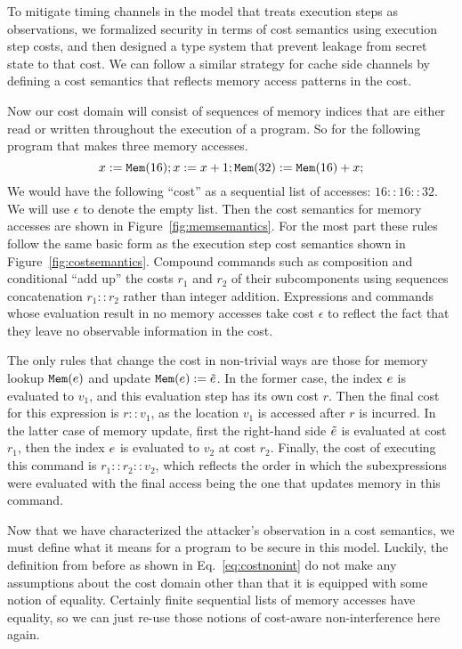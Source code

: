 \documentclass[11pt,twoside]{scrartcl}
\begin{document}
To mitigate timing channels in the model that treats execution steps as observations, we formalized security in terms of cost semantics using execution step costs, and then designed a type system that prevent leakage from secret state to that cost. We can follow a similar strategy for cache side channels by defining a cost semantics that reflects memory access patterns in the cost. 

Now our cost domain will consist of sequences of memory indices that are either read or written throughout the execution of a program. So for the following program that makes three memory accesses.
\[
x := \texttt{\upshape Mem}(16); x := x + 1; \texttt{\upshape Mem}(32) := \texttt{\upshape Mem}(16) + x;
\]
We would have the following ``cost'' as a sequential list of accesses: $16 :: 16 :: 32$. We will use $\epsilon$ to denote the empty list. Then the cost semantics for memory accesses are shown in Figure~\ref{fig:memsemantics}. For the most part these rules follow the same basic form as the execution step cost semantics shown in Figure~\ref{fig:costsemantics}. Compound commands such as composition and conditional ``add up'' the costs $r_1$ and $r_2$ of their subcomponents using sequences concatenation $r_1 :: r_2$ rather than integer addition. Expressions and commands whose evaluation result in no memory accesses take cost $\epsilon$ to reflect the fact that they leave no observable information in the cost.

The only rules that change the cost in non-trivial ways are those for memory lookup $\texttt{\upshape Mem}(e)$ and update $\texttt{\upshape Mem}(e) := \tilde{e}$. In the former case, the index $e$ is evaluated to $v_1$, and this evaluation step has its own cost $r$. Then the final cost for this expression is $r :: v_1$, as the location $v_1$ is accessed after $r$ is incurred. In the latter case of memory update, first the right-hand side $\tilde{e}$ is evaluated at cost $r_1$, then the index $e$ is evaluated to $v_2$ at cost $r_2$. Finally, the cost of executing this command is $r_1 :: r_2 :: v_2$, which reflects the order in which the subexpressions were evaluated with the final access being the one that updates memory in this command.

Now that we have characterized the attacker's observation in a cost semantics, we must define what it means for a program to be secure in this model. Luckily, the definition from before as shown in Eq.~\ref{eq:costnonint} do not make any assumptions about the cost domain other than that it is equipped with some notion of equality. Certainly finite sequential lists of memory accesses have equality, so we can just re-use those notions of cost-aware non-interference here again.
\end{document}
